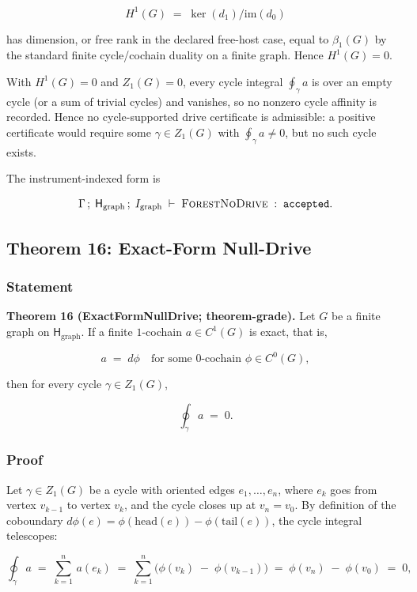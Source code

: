 \documentclass[11pt]{article}
\theoremstyle{definition}
\begin{document}
\[
H^1(G)\;=\;\ker(d_1)/\mathrm{im}(d_0)
\]

has dimension, or free rank in the declared free-host case, equal to \(\beta_1(G)\) by the standard finite cycle/cochain duality on a finite graph. Hence \(H^1(G)=0\).

With \(H^1(G)=0\) and \(Z_1(G)=0\), every cycle integral \(\oint_\gamma a\) is over an empty cycle (or a sum of trivial cycles) and vanishes, so no nonzero cycle affinity is recorded. Hence no cycle-supported drive certificate is admissible: a positive certificate would require some \(\gamma\in Z_1(G)\) with \(\oint_\gamma a\neq 0\), but no such cycle exists.

The instrument-indexed form is

\[
\Gamma\,;\;\mathsf H_{\mathrm{graph}}\,;\;I_{\mathrm{graph}}\;\vdash\;\textsc{ForestNoDrive}\;:\;\texttt{accepted}.
\]

\subsection{Theorem 16: Exact-Form Null-Drive}

\subsubsection{Statement}

\textbf{Theorem 16 (ExactFormNullDrive; theorem-grade).} Let \(G\) be a finite graph on \(\mathsf H_{\mathrm{graph}}\). If a finite \(1\)-cochain \(a\in C^1(G)\) is exact, that is,

\[
a\;=\;d\phi\quad\text{for some }0\text{-cochain }\phi\in C^0(G),
\]

then for every cycle \(\gamma\in Z_1(G)\),

\[
\oint_\gamma a\;=\;0.
\]

\subsubsection{Proof}

Let \(\gamma\in Z_1(G)\) be a cycle with oriented edges \(e_1,\ldots,e_n\), where \(e_k\) goes from vertex \(v_{k-1}\) to vertex \(v_k\), and the cycle closes up at \(v_n=v_0\). By definition of the coboundary \(d\phi(e)=\phi(\mathrm{head}(e))-\phi(\mathrm{tail}(e))\), the cycle integral telescopes:

\[
\oint_\gamma a\;=\;\sum_{k=1}^{n}\,a(e_k)\;=\;\sum_{k=1}^{n}\bigl(\phi(v_k)\;-\;\phi(v_{k-1})\bigr)\;=\;\phi(v_n)\;-\;\phi(v_0)\;=\;0,
\]
\end{document}
